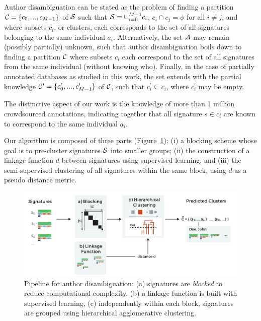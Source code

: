 \documentclass[runningheads,a4paper]{llncs}
\newcommand{\longpage}{\enlargethispage{\baselineskip}}
\begin{document}
Author disambiguation can be stated as the problem of
finding a partition ${\cal C} = \{ c_0, ..., c_{M-1} \}$ of ${\cal S}$ such
that ${\cal S} = \cup_{i=0}^{M-1} c_i$, $c_i \cap c_j = \phi$ for all $i \neq
j$, and where subsets $c_i$, or clusters, each corresponds to the set of all
signatures belonging to the same individual $a_i$. Alternatively, the set
${\cal A}$ may remain (possibly partially) unknown, such that author
disambiguation boils down to finding a partition ${\cal C}$ where
subsets $c_i$  each correspond to the set of all signatures from the same
individual (without knowing who). Finally, in the case of partially annotated databases as studied in
this work, the set extends with the partial knowledge ${\cal C}^\prime = \{ c_0^\prime, ..., c_{M-1}^\prime \}$ of ${\cal C}$,
such that $c_i^\prime \subseteq c_i$, where $c_i^\prime$ may be empty.

The distinctive aspect of our work is the
knowledge of more than 1 million crowdsourced annotations, indicating together that all signature $s \in
c_i^\prime$ are known to correspond to the same individual $a_i$.

\longpage

Our algorithm is composed of three parts (Figure~\ref{fig:workflow}): (i) a blocking
scheme whose goal is to pre-cluster signatures ${\cal S}$ into smaller groups; (ii) the construction of a linkage function
$d$ between signatures using supervised learning; and (iii) the
semi-supervised clustering of all signatures within the same block, using $d$ as a pseudo distance metric.


\begin{figure}
\centering
\includegraphics[width=\textwidth]{fig-workflow.pdf}
\caption{Pipeline for author disambiguation: (a)
signatures are \textit{blocked} to reduce computational complexity, (b) a linkage
function is built with supervised learning, (c) independently within each block, signatures
are grouped using hierarchical agglomerative clustering.}
\label{fig:workflow}
\end{figure}
\end{document}
